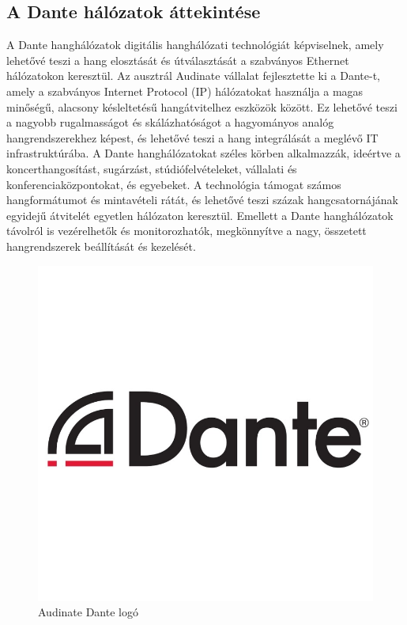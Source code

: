 \subsection{A Dante hálózatok áttekintése}
A Dante hanghálózatok digitális hanghálózati technológiát képviselnek, amely
lehetővé teszi a hang elosztását és útválasztását a szabványos Ethernet
hálózatokon keresztül. Az ausztrál Audinate vállalat fejlesztette ki a Dante-t,
amely a szabványos Internet Protocol (IP) hálózatokat használja a magas minőségű,
alacsony késleltetésű hangátvitelhez eszközök között. Ez lehetővé teszi a
nagyobb rugalmasságot és skálázhatóságot a hagyományos analóg hangrendszerekhez
képest, és lehetővé teszi a hang integrálását a meglévő IT infrastruktúrába. A
Dante hanghálózatokat széles körben alkalmazzák, ideértve a koncerthangosítást,
sugárzást, stúdiófelvételeket, vállalati és konferenciaközpontokat, és egyebeket.
A technológia támogat számos hangformátumot és mintavételi rátát, és lehetővé
teszi százak hangcsatornájának egyidejű átvitelét egyetlen hálózaton keresztül.
Emellett a Dante hanghálózatok távolról is vezérelhetők és monitorozhatók,
megkönnyítve a nagy, összetett hangrendszerek beállítását és kezelését.
\begin{figure}[H]
	\centering
	\includegraphics[width=\textwidth, keepaspectratio]{figures/dante_logo.jpg}
	\caption{Audinate Dante logó}
	\label {fig:dante_logo}
\end{figure}





